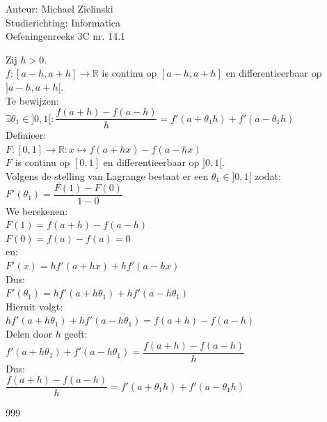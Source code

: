 \documentclass[a4paper]{article}
\begin{document}
  
\noindent \large Auteur: Michael Zielinski \\
\noindent \large Studierichting: Informatica\\
\noindent \large Oefeningenreeks 3C nr. 14.1\\

\medskip

\normalsize

Zij $h>0$. \\

$f:[a-h,a+h] \rightarrow \mathbb{R}$ is continu op $[a-h,a+h]$ en differentieerbaar op $]a-h,a+h[$. \\

Te bewijzen: \\

$ \exists \theta_1 \in ]0,1[ :
\dfrac{f(a+h)-f(a-h)}{h}
= f'(a+\theta_1h)+f'(a-\theta_1h) $ \\

Definieer: \\

$ F:[0,1]\rightarrow \mathbb{R}: x \mapsto f(a+hx)-f(a-hx) $ \\

$F$ is continu op $[0,1]$ en differentieerbaar op $]0,1[$. \\

Volgens de stelling van Lagrange bestaat er een $\theta_1 \in ]0,1[$ zodat: \\

$ F'(\theta_1)=\dfrac{F(1)-F(0)}{1-0} $ \\

We berekenen: \\

$ F(1)=f(a+h)-f(a-h) $ \\

$ F(0)=f(a)-f(a)=0 $ \\

en: \\

$ F'(x)=h f'(a+hx)+h f'(a-hx) $ \\

Dus: \\

$ F'(\theta_1)
= h f'(a+h\theta_1)+h f'(a-h\theta_1) $ \\

Hieruit volgt: \\

$ h f'(a+h\theta_1)+h f'(a-h\theta_1)
= f(a+h)-f(a-h) $ \\

Delen door $h$ geeft: \\

$ f'(a+h\theta_1)+f'(a-h\theta_1)
= \dfrac{f(a+h)-f(a-h)}{h} $ \\

Dus: \\

$ \dfrac{f(a+h)-f(a-h)}{h}
= f'(a+\theta_1h)+f'(a-\theta_1h) $ \\

\begin{thebibliography}{999}
\end{thebibliography}
\end{document}
